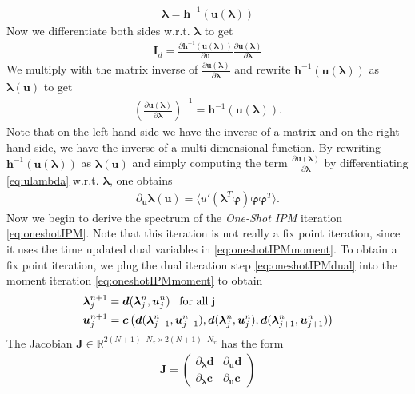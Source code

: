 \documentclass[10pt, a4paper, titlepage, bibliography=totocnumbered]{article}
\newenvironment{proof}[1][Proof]{\begin{trivlist}
\item[\hskip \labelsep {\bfseries #1}]}{\end{trivlist}}
\begin{document}
\begin{proof}
\begin{align}
\bm{\lambda} = \bm{h}^{-1}(\bm{u}(\bm{\lambda}))
\end{align}
Now we differentiate both sides w.r.t. $\bm{\lambda}$ to get
\begin{align*}
\bm{I}_{d} = \frac{\partial \bm{h}^{-1}(\bm{u}(\bm{\lambda}))}{\partial \bm{u}}\frac{\partial \bm{u}(\bm{\lambda})}{\partial \bm{\lambda}}
\end{align*}
We multiply with the matrix inverse of $\frac{\partial \bm{u}(\bm{\lambda})}{\partial \bm{\lambda}}$ and rewrite $\bm{h}^{-1}(\bm{u}(\bm{\lambda}))$ as $\bm{\lambda}(\bm{u})$ to get
\begin{align*}
\left(\frac{\partial \bm{u}(\bm{\lambda})}{\partial \bm{\lambda}}\right)^{-1} = \bm{h}^{-1}(\bm{u}(\bm{\lambda})).
\end{align*}
Note that on the left-hand-side we have the inverse of a matrix and on the right-hand-side, we have the inverse of a multi-dimensional function. By rewriting $\bm{h}^{-1}(\bm{u}(\bm{\lambda}))$ as $\bm{\lambda}(\bm{u})$ and simply computing the term $\frac{\partial \bm{u}(\bm{\lambda})}{\partial \bm{\lambda}}$ by differentiating \eqref{eq:ulambda} w.r.t. $\bm{\lambda}$, one obtains
\begin{align}\label{eq:dudlambdaex}
\partial_{\bm{u}} \bm{\lambda}(\bm{u}) = \langle u'(\bm{\lambda}^T\bm{\varphi})\bm{\varphi}\bm{\varphi}^T\rangle.
\end{align}
Now we begin to derive the spectrum of the \textit{One-Shot IPM} iteration \eqref{eq:oneshotIPM}. Note that this iteration is not really a fix point iteration, since it uses the time updated dual variables in \eqref{eq:oneshotIPMmoment}. To obtain a fix point iteration, we plug the dual iteration step \eqref{eq:oneshotIPMdual} into the moment iteration \eqref{eq:oneshotIPMmoment} to obtain
\begin{align*}
&\bm{\lambda}_j^{n+1} = \bm{d}(\bm{\lambda}_j^{n},\bm{u}_j^{n}) \enskip \text{ for all j} \\
&\bm{u}_j^{n+1} =  \bm{c}\left(\bm{d}(\bm{\lambda}_{j-1}^{n},\bm{u}_{j-1}^{n}),\bm{d}(\bm{\lambda}_{j}^{n},\bm{u}_{j}^{n}),\bm{d}(\bm{\lambda}_{j+1}^{n},\bm{u}_{j+1}^{n})\right)
\end{align*}
The Jacobian $\bm{J}\in\mathbb{R}^{2(N+1)\cdot N_x \times 2(N+1)\cdot N_x}$ has the form
\begin{align*}
\bm{J} = 
\begin{pmatrix}
 \partial_{\bm{\lambda}} \bm{d} & \partial_{\bm{u}} \bm{d}  \\
\partial_{\bm{\lambda}} \bm{c} & \partial_{\bm{u}} \bm{c}

\end{pmatrix}
\end{align*}
\end{proof}
\end{document}
